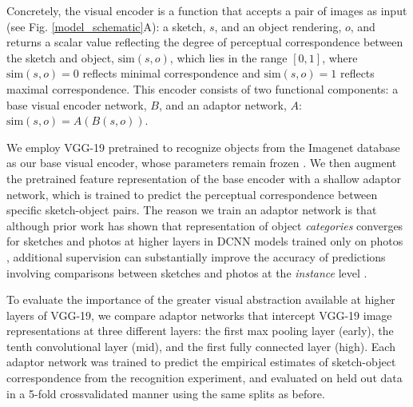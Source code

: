 \documentclass[9pt,twocolumn,twoside]{pnas-new}
\begin{document}

Concretely, the visual encoder is a function that accepts a pair of images as input (see Fig. \ref{model_schematic}A): a sketch, $s$, and an object rendering, $o$, and returns a scalar value reflecting the degree of perceptual correspondence between the sketch and object, $\textrm{sim}(s,o)$, which lies in the range $[0,1]$, where $\textrm{sim}(s,o)=0$ reflects minimal correspondence and $\textrm{sim}(s,o)=1$ reflects maximal correspondence.
This encoder consists of two functional components: a base visual encoder network, $B$, and an adaptor network, $A$: $\textrm{sim}(s,o) = A(B(s,o))$.

We employ VGG-19 pretrained to recognize objects from the Imagenet database as our base visual encoder, whose parameters remain frozen \cite{simonyan2014very}. 
We then augment the pretrained feature representation of the base encoder with a shallow adaptor network, which is trained to predict the perceptual correspondence between specific sketch-object pairs.
The reason we train an adaptor network is that although prior work has shown that representation of object \textit{categories} converges for sketches and photos at higher layers in DCNN models trained only on photos \cite{FanCommon2018}, additional supervision can substantially improve the accuracy of predictions involving comparisons between sketches and photos at the \textit{instance} level \cite{sangkloy2016sketchy}. 


To evaluate the importance of the greater visual abstraction available at higher layers of VGG-19, we compare adaptor networks that intercept VGG-19 image representations at three different layers: the first max pooling layer (early), the tenth convolutional layer (mid), and the first fully connected layer (high).
Each adaptor network was trained to predict the empirical estimates of sketch-object correspondence from the recognition experiment, and evaluated on held out data in a 5-fold crossvalidated manner using the same splits as before. 
\end{document}
